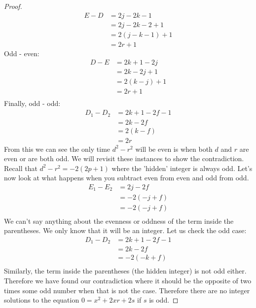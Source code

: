 \documentclass{article}
\begin{document}
\begin{proof}
\begin{align*}
    E - D &= 2j - 2k - 1\\
    &= 2j - 2k - 2 + 1\\
    &= 2(j-k-1) + 1\\
    &= 2r + 1
\end{align*}
Odd - even:
\begin{align*}
    D - E &= 2k + 1 - 2j\\
    &= 2k - 2j + 1\\
    &= 2(k-j) +1\\
    &= 2r + 1\\
\end{align*}
Finally, odd - odd:
\begin{align*}
    D_1 - D_2 &= 2k + 1 - 2f - 1\\
    &= 2k - 2f\\
    &= 2(k-f)\\
    &= 2r
\end{align*}
From this we can see the only time $d^2 - r^2$ will be even is when both $d$ and $r$ are even or are both odd. We will revisit these instances to show the contradiction. Recall that $d^2 - r^2 = -2(2p+1)$ where the 'hidden' integer is always odd. Let's now look at what happens when you subtract even from even and odd from odd.
\begin{align*}
    E_1 - E_2 &= 2j - 2f\\
    &= -2(-j+f)\\
    &= -2(-j + f)\\
\end{align*}
We can't say anything about the evenness or oddness of the term inside the parentheses. We only know that it will be an integer. Let us check the odd case:
\begin{align*}
    D_1 - D_2 &= 2k + 1 - 2f - 1\\
    &= 2k - 2f\\
    &= -2(-k+f)\\
\end{align*}
Similarly, the term inside the parentheses (the hidden integer) is not odd either. Therefore we have found our contradiction where it should be the opposite of two times some odd number when that is not the case. Therefore there are no integer solutions to the equation $0= x^2 + 2xr + 2s$ if $s$ is odd.
    \end{proof}
\end{document}

